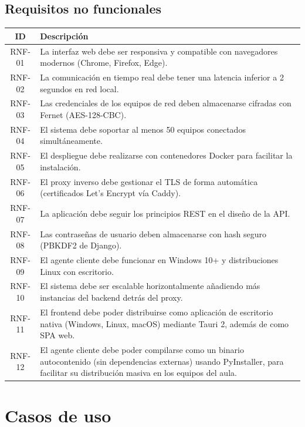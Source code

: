 \documentclass[12pt, a4paper, twoside]{article}
\begin{document}
\subsection{Requisitos no funcionales}

\begin{longtable}{cp{11cm}}
  \toprule
  \textbf{ID} & \textbf{Descripción} \\
  \midrule
  \endhead
  RNF-01 & La interfaz web debe ser responsiva y compatible con navegadores modernos (Chrome, Firefox, Edge). \\
  RNF-02 & La comunicación en tiempo real debe tener una latencia inferior a 2 segundos en red local. \\
  RNF-03 & Las credenciales de los equipos de red deben almacenarse cifradas con Fernet (AES-128-CBC). \\
  RNF-04 & El sistema debe soportar al menos 50 equipos conectados simultáneamente. \\
  RNF-05 & El despliegue debe realizarse con contenedores Docker para facilitar la instalación. \\
  RNF-06 & El proxy inverso debe gestionar el TLS de forma automática (certificados Let's Encrypt vía Caddy). \\
  RNF-07 & La aplicación debe seguir los principios REST en el diseño de la API. \\
  RNF-08 & Las contraseñas de usuario deben almacenarse con hash seguro (PBKDF2 de Django). \\
  RNF-09 & El agente cliente debe funcionar en Windows 10+ y distribuciones Linux con escritorio. \\
  RNF-10 & El sistema debe ser escalable horizontalmente añadiendo más instancias del backend detrás del proxy. \\
  RNF-11 & El frontend debe poder distribuirse como aplicación de escritorio nativa (Windows, Linux, macOS) mediante Tauri 2, además de como SPA web. \\
  RNF-12 & El agente cliente debe poder compilarse como un binario autocontenido (sin dependencias externas) usando PyInstaller, para facilitar su distribución masiva en los equipos del aula. \\
  \bottomrule
\end{longtable}

\section{Casos de uso}
\end{document}
